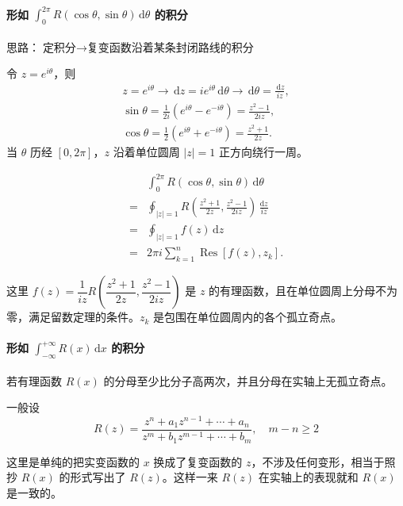 \paragraph{形如 \(\int_0^{2\pi}R(\cos \theta, \sin \theta)\,\mathrm{d}\theta\) 的积分}
\label{形如-int_02pircos-theta-sin-thetamathrmdtheta-的积分}
思路：\(\boxed{\text{定积分}} \rightarrow \boxed{\text{复变函数沿着某条封闭路线的积分}}\)

令 \(z=e^{i\theta}\)，则
\begin{align*}
z=e^{i\theta} \longrightarrow \,\mathrm{d}z=ie^{i\theta}\,\mathrm{d}\theta \longrightarrow \,\mathrm{d}\theta=\frac{\,\mathrm{d}z}{iz},\\
\sin \theta = \frac{1}{2i}(e^{i\theta}-e^{-i\theta})=\frac{z^2-1}{2iz}, \\
\cos \theta = \frac{1}{2}(e^{i\theta}+e^{-i\theta})=\frac{z^2+1}{2z}.
\end{align*}
当 \(\theta\) 历经 \([0,2\pi]\)，\(z\) 沿着单位圆周
\(\left|z\right|=1\) 正方向绕行一周。


\begin{align*}
    & \int _{0}^{2\pi} R (\cos\theta, \sin\theta)\,\mathrm{d}\theta\\
    =& \oint _{|z| = 1} R \left( \frac{z^2+1}{2z},\frac{z^2-1}{2iz} \right) \,\frac{\mathrm{d}z}{iz}\\
    =& \oint _{|z| = 1} f(z) \,\mathrm{d}z\\
    =& 2\pi i \sum _{k=1}^{n} \operatorname{Res}[f(z),z_k].
\end{align*}


这里
\(f(z) = \dfrac{1}{iz} R\left( \dfrac{z^2+1}{2z}, \dfrac{z^2-1}{2iz} \right)\)
是 \(z\)
的有理函数，且在单位圆周上分母不为零，满足留数定理的条件。\(z_k\)
是包围在单位圆周内的各个孤立奇点。
\paragraph{形如 \(\int_{-\infty}^{+\infty}R(x)\,\mathrm{d}x\) 的积分}
\label{形如-int_-inftyinftyrxmathrmdx-的积分}
若有理函数 \(R(x)\) 的分母至少比分子高两次，并且分母在实轴上无孤立奇点。

一般设
\[
R(z)=\frac{z^n+a_1z^{n-1}+\cdots+a_n}{z^m+b_1z^{m-1}+\cdots+b_m},\quad m-n \ge 2
\]

\begin{tcolorbox}[title={Info},colback=red!5!white
,colframe=red!75!black
,colbacktitle=yellow!50!red
,coltitle=red!25!black, fonttitle=\bfseries,subtitle style={boxrule=0.4pt, colback=yellow!50!red!25!white}]
这里是单纯的把实变函数的 \(x\) 换成了复变函数的
\(z\)，不涉及任何变形，相当于照抄 \(R(x)\) 的形式写出了
\(R(z)\)。这样一来 \(R(z)\) 在实轴上的表现就和 \(R(x)\) 是一致的。

\end{tcolorbox}


